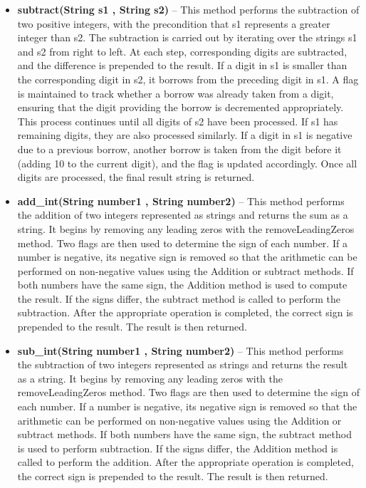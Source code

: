 \documentclass[a4paper,12pt]{article}
\begin{document}
{\begin{itemize}
    \item \textbf{subtract(String s1 , String s2)} -- This method performs the subtraction of two positive integers, with the precondition that s1 represents a greater integer than s2. The subtraction is carried out by iterating over the strings s1 and s2 from right to left. At each step, corresponding digits are subtracted, and the difference is prepended to the result. If a digit in s1 is smaller than the corresponding digit in s2, it borrows from the preceding digit in s1. A flag is maintained to track whether a borrow was already taken from a digit, ensuring that the digit providing the borrow is decremented appropriately. This process continues until all digits of s2 have been processed. If s1 has remaining digits, they are also processed similarly. If a digit in s1 is negative due to a previous borrow, another borrow is taken from the digit before it (adding 10 to the current digit), and the flag is updated accordingly. Once all digits are processed, the final result string is returned.\\

    \item \textbf{add\_int(String number1 , String number2)} -- This method performs the addition of two integers represented as strings and returns the sum as a string. It begins by removing any leading zeros with the removeLeadingZeros method. Two flags are then used to determine the sign of each number. If a number is negative, its negative sign is removed so that the arithmetic can be performed on non-negative values using the Addition or subtract methods. If both numbers have the same sign, the Addition method is used to compute the result. If the signs differ, the subtract method is called to perform the subtraction. After the appropriate operation is completed, the correct sign is prepended to the result. The result is then returned.\\

    \item \textbf{sub\_int(String number1 , String number2)} -- This method performs the subtraction of two integers represented as strings and returns the result as a string. It begins by removing any leading zeros with the removeLeadingZeros method. Two flags are then used to determine the sign of each number. If a number is negative, its negative sign is removed so that the arithmetic can be performed on non-negative values using the Addition or subtract methods. If both numbers have the same sign, the subtract method is used to perform subtraction. If the signs differ, the Addition method is called to perform the addition. After the appropriate operation is completed, the correct sign is prepended to the result. The result is then returned.


\end{itemize}}
\end{document}
